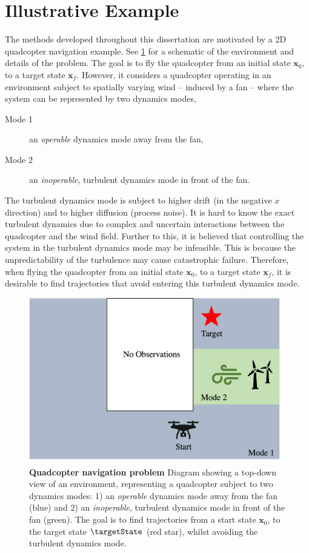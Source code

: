 \documentclass{mimosis-class/mimosis}
\numberwithin{equation}{chapter}
\newcommand{\state}{\ensuremath{\mathbf{x}}}
\begin{document}
\section{Illustrative Example \label{illustrative_example}}
\label{sec:org369af81}
The methods developed throughout this dissertation are motivated by a 2D quadcopter navigation example.
See \cref{fig-problem-statement} for a schematic of the environment and details of the problem.
The goal is to fly the quadcopter from an initial state \(\state_0\), to a target state \(\state_{f}\).
However, it considers a quadcopter operating in an environment subject to spatially varying wind --
induced by a fan -- where the system can be represented by two dynamics modes,
\begin{description}
\item[{Mode 1}] an \emph{operable} dynamics mode away from the fan,
\item[{Mode 2}] an \emph{inoperable}, turbulent dynamics mode in front of the fan.
\end{description}
The turbulent dynamics mode is subject to higher drift (in the negative \(x\) direction) and
to higher diffusion (process noise).
It is hard to know the exact turbulent dynamics due to complex and uncertain interactions between the
quadcopter and the wind field.
Further to this, it is believed that controlling the system in the turbulent dynamics mode may be infeasible.
This is because the unpredictability of the turbulence may cause catastrophic failure.
Therefore, when flying the quadcopter from an initial state \(\state_0\), to a target state \(\state_{f}\),
it is desirable to find trajectories that avoid entering this turbulent dynamics mode.
\begin{figure}[t!]
\centering
\includegraphics[width=1.0\textwidth]{./images/quadcopter-domain-collocation-ppt.png}
\caption[Quadcopter navigation problem]{\label{fig-problem-statement}\textbf{Quadcopter navigation problem}
Diagram showing a top-down view of an environment, representing a quadcopter subject to two dynamics modes:
1) an \textit{operable} dynamics mode away from the fan (blue) and 2) an \textit{inoperable}, turbulent dynamics mode in front of the fan (green).
The goal is to find trajectories from a start state $\state_0$, to the target state $\targetState$ (red star),
whilst avoiding the turbulent dynamics mode.}
\end{figure}
\end{document}

